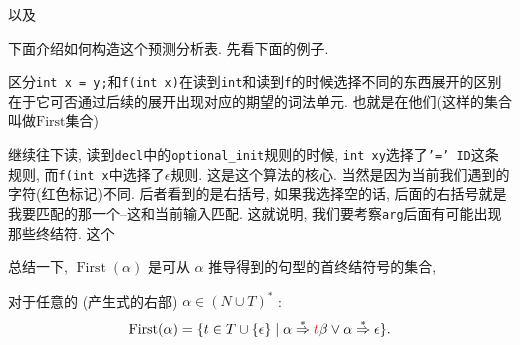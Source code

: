 \documentclass{ctexart}
\begin{document}
\begin{algorithm}[H]
    \begin{algorithmic}[1]
          \State {}
        \Else
          \State {}
        \EndIf
      \EndProcedure
    \end{algorithmic}
    \end{algorithm}

    以及

    \begin{algorithm}[H]
        \begin{algorithmic}[1]
              \State {}
              \State {}
              \State {}
              \State {}
              \State {}
              \State {}
            \Else
              \State {} 
            \EndIf
          \EndProcedure
        \end{algorithmic}
        \end{algorithm}

下面介绍如何构造这个预测分析表. 先看下面的例子. 


区分\texttt{int x = y;}和\texttt{f(int x)}在读到\texttt{int}和读到\texttt{f}的时候选择不同的东西展开的区别在于它可否通过后续的展开出现对应的期望的词法单元. 也就是在他们(这样的集合叫做$\text{First}$集合) 

继续往下读, 读到\texttt{decl}中的\texttt{optional\_init}规则的时候, \texttt{int x\red{=}y}选择了\texttt{'=' ID}这条规则, 而\texttt{f(int x\red{)}}中选择了$\epsilon$规则. 这是这个算法的核心. 当然是因为当前我们遇到的字符(红色标记)不同. 后者看到的是右括号, 如果我选择空的话, 后面的右括号就是我要匹配的那一个--这和当前输入匹配. 这就说明, 我们要考察\texttt{arg}后面有可能出现那些终结符. 这个

总结一下,  
$\operatorname{First}(\alpha)$ 是可从 $\alpha$ 推导得到的句型的首终结符号的集合, 

\begin{definition}[First集合]
    对于任意的 (产生式的右部) $\alpha \in(N \cup T)^*$ :
$$
\operatorname{First}(\alpha)=\{t \in T \cup\{\epsilon\} \mid \alpha \stackrel{*}{\Rightarrow} {{\color{red}t}} \beta \vee \alpha \stackrel{*}{\Rightarrow} \epsilon\} .
$$
\end{definition}
\end{document}
